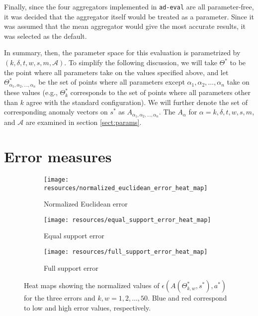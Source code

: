 Finally, since the four aggregators implemented in \texttt{ad-eval} are all parameter-free, it was decided that the aggregator itself would be treated as a parameter. Since it was assumed that the mean aggregator would give the most accurate results, it was selected as the default.

In summary, then, the parameter space for this evaluation is parametrized by $(k, \delta, t, w, s, m, \mathcal{A})$. To simplify the following discussion, we will take $\Theta^*$ to be the point where all parameters take on the values specified above, and let $\Theta^*_{\alpha_1, \alpha_2, \dots, \alpha_n}$ be the set of points where all parameters except $\alpha_1, \alpha_2, \dots, \alpha_n$ take on these values (e.g., $\Theta^*_k$ corresponds to the set of points where all parameters other than $k$ agree with the standard configuration). We will further denote the set of corresponding anomaly vectors on $s^*$ as $A_{\alpha_1, \alpha_2, \dots, \alpha_n}$. The $A_\alpha$ for $\alpha = k, \delta, t, w, s, m$, and $\mathcal{A}$ are examined in section \ref{sect:params}.

\section{Error measures}
\label{sect:error_measure_eval}

\begin{figure}[H]
    \centering
    \begin{subfigure}[b]{0.32\textwidth}
        \centering
        \texttt{[image: resources/normalized\_euclidean\_error\_heat\_map]}
        \caption{Normalized Euclidean error}
    \end{subfigure}
    \begin{subfigure}[b]{0.32\textwidth}
        \centering
        \texttt{[image: resources/equal\_support\_error\_heat\_map]}
        \caption{Equal support error}
    \end{subfigure}
    \begin{subfigure}[b]{0.32\textwidth}
        \centering
        \texttt{[image: resources/full\_support\_error\_heat\_map]}
        \caption{Full support error}
    \end{subfigure}
    \caption{Heat maps showing the normalized values of $\epsilon(A(\Theta_{k, w}^*, s^*), a^*)$ for the three errors and $k, w = 1,2,\dots,50$. Blue and red correspond to low and high error values, respectively.}
    \label{fig:error_heat_maps}
    \vspace{-10pt}
\end{figure}

